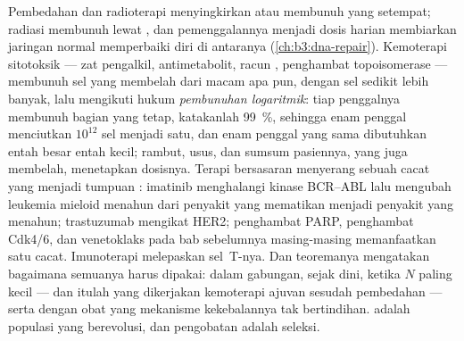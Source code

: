 \begin{example}\label{ex:b3:cancer-biology:therapy}
Pembedahan dan radioterapi menyingkirkan atau membunuh  yang setempat;
radiasi membunuh lewat , dan pemenggalannya menjadi dosis
harian membiarkan jaringan normal memperbaiki diri di antaranya
(\cref{ch:b3:dna-repair}). Kemoterapi sitotoksik --- zat pengalkil,
antimetabolit, racun , penghambat topoisomerase --- membunuh sel
yang membelah dari macam apa pun, dengan sel  sedikit lebih banyak,
lalu mengikuti hukum \emph{pembunuhan logaritmik}: tiap penggalnya membunuh
bagian yang tetap, katakanlah \qty{99}{\%}, sehingga enam penggal menciutkan
$10^{12}$ sel menjadi satu, dan enam penggal yang sama dibutuhkan entah
 besar entah kecil; rambut, usus, dan sumsum pasiennya, yang juga
membelah, menetapkan dosisnya. Terapi bersasaran menyerang sebuah cacat yang
menjadi tumpuan : imatinib menghalangi kinase BCR--ABL lalu mengubah
leukemia mieloid menahun dari penyakit yang mematikan menjadi penyakit yang
menahun; trastuzumab mengikat HER2; penghambat PARP, penghambat Cdk4/6, dan
venetoklaks pada bab sebelumnya masing-masing memanfaatkan satu cacat.
Imunoterapi melepaskan sel~T-nya. Dan teoremanya mengatakan bagaimana semuanya
harus dipakai: dalam gabungan, sejak dini, ketika $N$ paling kecil --- dan
itulah yang dikerjakan kemoterapi ajuvan sesudah pembedahan --- serta dengan
obat yang mekanisme kekebalannya tak bertindihan.  adalah populasi
yang berevolusi, dan pengobatan adalah seleksi.
\end{example}

